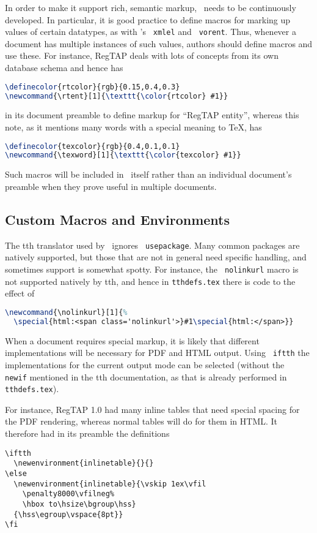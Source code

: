 \documentclass[11pt,a4paper]{ivoa}
\newcommand{\texword}[1]{\texttt{\color{texcolor} #1}}
\begin{document}
In order to make it support rich, semantic markup, \ivoatex\ needs to be
continuously developed.  In particular, it is good practice to define
macros for marking up values of certain datatypes, as with \ivoatex's
\texword{xmlel} and \texword{vorent}.  
Thus, whenever a document has multiple
instances of such values, authors should define macros and use these.
For instance, RegTAP deals with lots of concepts from its own
database schema and hence has
\begin{lstlisting}[language=TeX]
\definecolor{rtcolor}{rgb}{0.15,0.4,0.3}
\newcommand{\rtent}[1]{\texttt{\color{rtcolor} #1}}
\end{lstlisting}
in its document preamble to
define markup for ``RegTAP entity'', whereas
this note, as it mentions many words with a special meaning to \TeX, has
\begin{lstlisting}[language=TeX]
\definecolor{texcolor}{rgb}{0.4,0.1,0.1}
\newcommand{\texword}[1]{\texttt{\color{texcolor} #1}}
\end{lstlisting}
Such macros will be included in \ivoatex\ itself rather than an
individual document's preamble when they prove useful in multiple
documents.

\subsection{Custom Macros and Environments}

The tth translator used by \ivoatex\ ignores \texword{usepackage}.  Many
common packages are natively supported, but those that are not in
general need specific handling, and sometimes support is somewhat spotty.  
For instance, the \texword{nolinkurl}
macro is not supported natively by tth, and hence in
\texttt{tthdefs.tex} there is code to the effect of
\begin{lstlisting}[language=TeX,basicstyle=\footnotesize]
\newcommand{\nolinkurl}[1]{%
  \special{html:<span class='nolinkurl'>}#1\special{html:</span>}}
\end{lstlisting}

When a document requires special markup, it is likely that 
different implementations will be necessary for PDF and HTML output.
Using \texword{iftth} the implementations for the current output mode
can be selected (without the \texword{newif} mentioned in the tth
documentation, as that is already performed in \texttt{tthdefs.tex}).

For instance, RegTAP 1.0 had many inline tables that need special spacing
for the PDF rendering, whereas normal tables will do for them
in HTML.  It therefore
had in its preamble the definitions
\begin{lstlisting}
\iftth
  \newenvironment{inlinetable}{}{}
\else
  \newenvironment{inlinetable}{\vskip 1ex\vfil
    \penalty8000\vfilneg%
    \hbox to\hsize\bgroup\hss}
  {\hss\egroup\vspace{8pt}}
\fi
\end{lstlisting}
\end{document}
